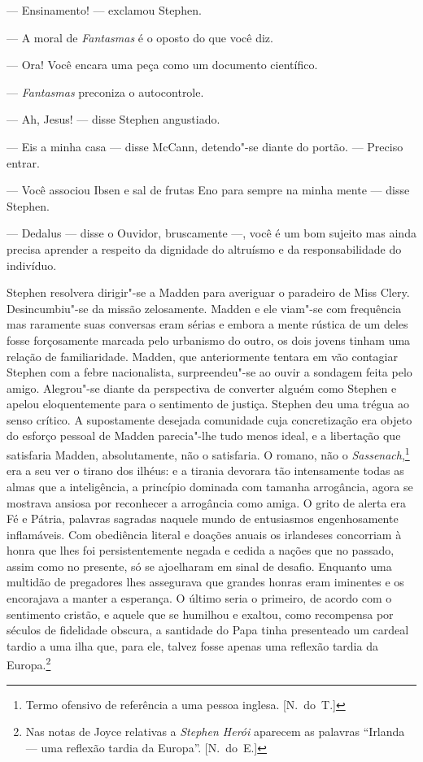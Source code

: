 --- Ensinamento! --- exclamou Stephen.

--- A moral de \textit{Fantasmas} é o oposto do que você diz.

--- Ora!  Você encara uma peça como um documento científico.

--- \textit{Fantasmas} preconiza o autocontrole.

--- Ah, Jesus! --- disse Stephen angustiado.

--- Eis a minha casa --- disse McCann, detendo"-se diante do portão.
--- Preciso entrar.

--- Você associou Ibsen e sal de frutas Eno para sempre na minha
mente --- disse Stephen.

--- Dedalus --- disse o Ouvidor, bruscamente ---, você é um bom
sujeito mas ainda precisa aprender a respeito da \label{dignidade"-do} dignidade do
altruísmo e da responsabilidade do indivíduo.

Stephen resolvera dirigir"-se a Madden para averiguar o
paradeiro de Miss Clery.  Desincumbiu"-se da missão zelosamente.  Madden
e ele viam"-se com frequência mas raramente suas conversas eram sérias e
embora a mente rústica de um deles fosse forçosamente marcada pelo
urbanismo do outro, os dois jovens tinham uma relação de familiaridade.
Madden, que anteriormente tentara em vão contagiar Stephen com a febre
nacionalista, surpreendeu"-se ao ouvir a sondagem feita pelo amigo.
Alegrou"-se diante da perspectiva de converter alguém como Stephen e
apelou eloquentemente para o sentimento de justiça.  Stephen deu uma
trégua ao senso crítico.  A supostamente desejada comunidade cuja
concretização era objeto do esforço pessoal de Madden parecia"-lhe tudo
menos ideal, e a libertação que satisfaria Madden, absolutamente, não o
satisfaria.  O romano, não o \textit{Sassenach},\footnote{ Termo
ofensivo de referência a uma pessoa inglesa. [N.~do~T.]} era a seu ver o
tirano dos ilhéus: e a tirania devorara tão intensamente todas as almas
que a inteligência, a princípio dominada com tamanha arrogância, agora
se mostrava ansiosa por reconhecer a arrogância como amiga.  O grito de
alerta era Fé e Pátria, palavras sagradas naquele mundo de entusiasmos
engenhosamente inflamáveis.  Com obediência literal e doações anuais os
irlandeses concorriam à honra que lhes foi persistentemente negada e
cedida a nações que no passado, assim como no
presente, só se ajoelharam em sinal de desafio.  Enquanto uma multidão
de pregadores lhes assegurava que grandes honras eram iminentes e os
encorajava a manter a esperança.  O último seria o primeiro, de acordo
com o sentimento cristão, e aquele que se humilhou e exaltou, como
recompensa por séculos de fidelidade obscura, \label{a"-santidade} a santidade do Papa
tinha presenteado um cardeal tardio a uma ilha que, para ele, talvez
fosse apenas uma \label{reflexao"-tardia} reflexão tardia da Europa.\footnote{ Nas notas de
Joyce relativas a \textit{Stephen Herói} aparecem as palavras “Irlanda
--- uma reflexão tardia da Europa”. [N.~do~E.]}

